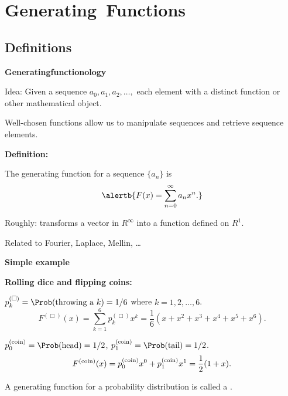 
\section{Generating\ Functions}

\subsection{Definitions}

\begin{frame}[label=]
  \textbf{Generatingfunctionology\cite{wilf2006a}}
  
    
    
      \alert{Idea:} Given a sequence 
      \alert{$a_0, a_1, a_2, \ldots,$}
       each element with a 
      distinct function or other mathematical object.
    
      Well-chosen functions allow us 
      to manipulate sequences and retrieve
      sequence elements.
    
%  

  \textbf{Definition:}
    
    
      The \alert{generating function}  for a sequence 
      $\{a_n\}$
      is
      $$
      \alertb{
      F(x) = \sum_{n=0}^{\infty} a_n x^n.
      }
      $$
    
      Roughly: transforms a vector in $R^\infty$
      into a function defined on $R^{1}$.
    
      Related to Fourier, Laplace, Mellin, \ldots
    
  


\begin{frame}[label=]
  \textbf{Simple example}
  
  \textbf{Rolling dice and flipping coins:}
    
     
      $p_k^{(\Box)} = \Prob(\mbox{throwing a} \ k) = 1/6$ where $k = 1, 2, \ldots, 6$.
      $$
      F^{(\Box)}(x) 
      = 
      \sum_{k=1}^{6} p_k^{(\Box)} x^k 
      = 
      \frac{1}{6} (x + x^2 + x^3 + x^4 + x^5 + x^6).
      $$
     
      $p_0^{\textnormal{(coin)}} = \Prob({\textnormal{head}}) = 1/2$, 
      $p_1^{\textnormal{(coin)}} = \Prob({\textnormal{tail}}) = 1/2$.
      $$
      F^{\textnormal{(coin)}}(x) 
      = 
      p_0^{\textnormal{(coin)}} x^0 + p_1^{\textnormal{(coin)}} x^1
      = 
      \frac{1}{2} (1 + x).
      $$
      
     A generating function for a probability distribution is
      called a .
     

\end{frame}
\end{frame}
